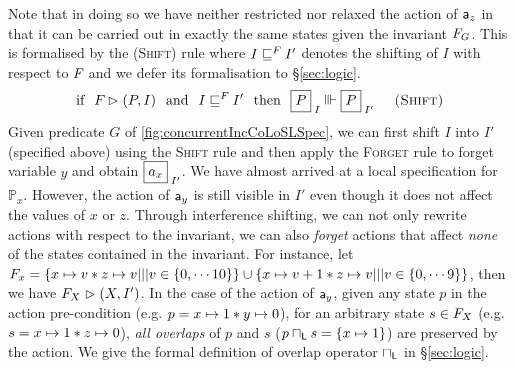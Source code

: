 %
Note that in doing so we have neither restricted nor relaxed the action of $\mathsf{a}_z$ in that it can be carried out in exactly the same states given the invariant $F_{G}$. This is formalised by the \textsc{(Shift)} rule where $I \sqsubseteq^{F_{}} I'$ denotes the shifting of $I$ with respect to $F_{}$ and we defer its formalisation to \S\ref{sec:logic}.
%
\[
	\text{if}\hspace*{0.25cm} \fence{} \fences (P, I) 
	\hspace*{0.25cm}\text{and}\hspace*{0.25cm} I \weakenI{\fence{}} I'
	\hspace*{0.25cm}\text{then}\hspace*{0.25cm}
	\shared{P}{I} \Vvdash \shared{P}{I'} \hspace*{0.5cm} \textsc{(Shift)}
\]
%
Given predicate $G$ of \fig\ref{fig:concurrentIncCoLoSLSpec}, we can first shift $I$ into $I'$ (specified above) using the \textsc{Shift} rule and then apply the \textsc{Forget} rule to forget variable $y$ and obtain $\shared{a_x}{I'}$.
We have almost arrived at a local specification for $\mathbb{P}_x$. However, the action of $\mathsf{a}_y$ is still visible in $I'$ even though it does not affect the values of $x$ or $z$. Through interference shifting, we can not only rewrite actions with respect to the invariant, we can also \emph{forget} actions that affect \emph{none} of the states contained in the invariant. For instance, let $F_{x} = \left\{x \mapsto v * z \mapsto v ||| v \in \{0, \cdots 10\} \right\} \cup \left\{x \mapsto v+1 * z \mapsto v ||| v \in \{0, \cdots 9 \} \right\}$, then we have $F_{X} \mathrel{\rhd} (X, I')$. In the case of the action of $\mathsf{a}_y$, given any state $p$ in the action pre-condition (e.g. $p = x \mapsto 1 * y \mapsto 0$), for an arbitrary state $s \in F_{X}$ (e.g. $s = x \mapsto 1 * z \mapsto 0$), \emph{all overlaps} of $p$ and $s$ ($p \sqcap_{\textsf{L}} s = \{x \mapsto 1\}$) are preserved by the action. We give the formal definition of overlap operator $\sqcap_{\textsf{L}}$ in \S\ref{sec:logic}. 
%
%
